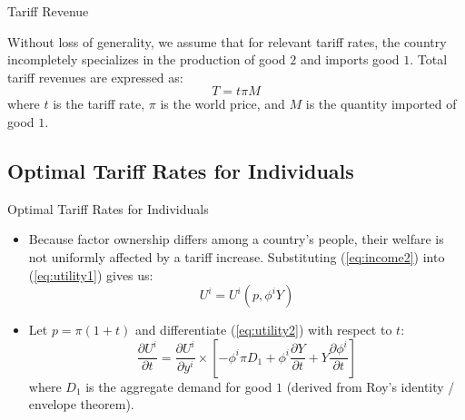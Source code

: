 \documentclass[aspectratio=169]{beamer}
\begin{document}

\begin{frame}{Tariff Revenue}

Without loss of generality, we assume that for relevant tariff rates, the country incompletely specializes in the production of good $ 2 $ and imports good $ 1 $.  Total tariff revenues are expressed as:
\begin{equation*}
    T = t \pi M
\end{equation*}
where $ t $ is the tariff rate, $ \pi $ is the world price, and $ M $ is the quantity imported of good $ 1 $.
    
\end{frame}


\subsection{Optimal Tariff Rates for Individuals}


\begin{frame}{Optimal Tariff Rates for Individuals}

\begin{itemize}
    \item<1-> Because factor ownership differs among a country’s people, their welfare is not uniformly affected by a tariff increase.  Substituting (\ref{eq:income2}) into (\ref{eq:utility1}) gives us:
    \begin{equation}
        U^{i} = U^{i}\left( p, \phi^{i} Y \right)
        \label{eq:utility2}
    \end{equation}
    \item<2-> Let $ p = \pi \left( 1 + t \right) $ and differentiate (\ref{eq:utility2}) with respect to $ t $:
    \begin{equation}
        \frac{\partial U^{i}}{\partial t} = \frac{\partial U^{i}}{\partial y^{i}} \times \left[ -\phi^{i} \pi D_{1} + \phi^{i} \frac{\partial Y}{\partial t} + Y \frac{\partial \phi^{i}}{\partial t} \right]
        \label{eq:dUdt1}
    \end{equation}
    where $ D_{1} $ is the aggregate demand for good $ 1 $ (derived from Roy’s identity / envelope theorem).
\end{itemize}
    
\end{frame}
\end{document}
